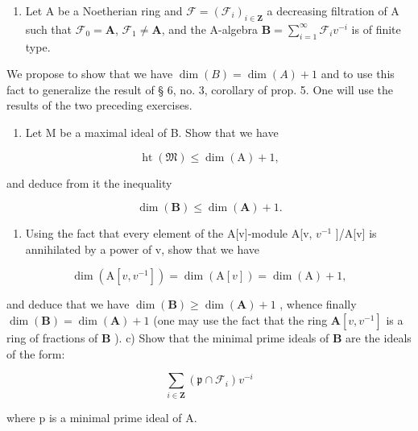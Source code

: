 \begin{enumerate}
\def\labelenumi{\arabic{enumi})}
\setcounter{enumi}{6}
\tightlist
\item
  Let A be a Noetherian ring and \(\mathcal{F} = (\mathcal{F}_i)_{i\in \mathbf{Z}}\) a decreasing filtration of A such that \(\mathcal{F}_0 = \mathbf{A}\), \(\mathcal{F}_1 \neq \mathbf{A}\), and the A-algebra \(\mathbf{B} = \sum_{i=1}^{\infty} \mathcal{F}_i v^{-i}\) is of finite type.
\end{enumerate}

We propose to show that we have \(\dim(B) = \dim(A) + 1\) and to use this fact to generalize the result of § 6, no. 3, corollary of prop. 5. One will use the results of the two preceding exercises.

\begin{enumerate}
\def\labelenumi{\alph{enumi})}
\tightlist
\item
  Let M be a maximal ideal of B. Show that we have
\end{enumerate}

\[
\operatorname{ht} (\mathfrak {M}) \leqslant \dim (\mathrm{A}) + 1,
\]

and deduce from it the inequality

\[
\dim (\mathbf {B}) \leqslant \dim (\mathbf {A}) + 1.
\]

\begin{enumerate}
\def\labelenumi{\alph{enumi})}
\setcounter{enumi}{1}
\tightlist
\item
  Using the fact that every element of the A{[}v{]}-module A{[}v, \(v^{-1}\) {]}/A{[}v{]} is annihilated by a power of v, show that we have
\end{enumerate}

\[
\dim (\mathrm{A} [ v, v ^ {- 1} ]) = \dim (\mathrm{A} [ v ]) = \dim (\mathrm{A}) + 1,
\]

and deduce that we have \(\dim(\mathbf{B}) \geqslant \dim(\mathbf{A}) + 1\) , whence finally \(\dim(\mathbf{B}) = \dim(\mathbf{A}) + 1\) (one may use the fact that the ring \(\mathbf{A}[v, v^{-1}]\) is a ring of fractions of \(\mathbf{B}\) ). c) Show that the minimal prime ideals of \(\mathbf{B}\) are the ideals of the form:

\[
\sum_ {i \in \mathbf {Z}} \left(\mathfrak {p} \cap \mathcal {F} _ {i}\right) v ^ {- i}
\]

where p is a minimal prime ideal of A.

